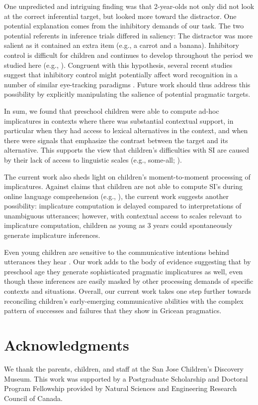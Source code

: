 \documentclass[10pt,letterpaper]{article}
\begin{document}
One unpredicted and intriguing finding was that 2-year-olds not only did not look at the correct inferential target, but looked more toward the distractor. One potential explanation comes from the inhibitory demands of our task. The two potential referents in inference trials differed in saliency: The distractor was more salient as it contained an extra item (e.g., a carrot and a banana). Inhibitory control is difficult for children and continues to develop throughout the period we studied here (e.g.,  ). Congruent with this hypothesis, several recent studies suggest that inhibitory control might potentially affect word recognition in a number of similar eye-tracking paradigms \cite{yurovskybeyond,nordmeyer2013measuring}. Future work should thus address this possibility by explicitly manipulating the salience of potential pragmatic targets.

In sum, we found that preschool children were able to compute ad-hoc implicatures in contexts where there was substantial contextual support, in particular when they had access to lexical alternatives in the context, and when there were signals that emphasize the contrast between the target and its alternative. This supports the view that children's difficulties with SI are caused by their lack of access to linguistic scales (e.g., some-all; ). 

The current work also sheds light on children's moment-to-moment processing of implicatures. Against claims that children are not able to compute SI's during online language comprehension (e.g., ), the current work suggests another possibility: implicature computation is delayed compared to interpretations of unambiguous utterances; however, with contextual access to scales relevant to implicature computation, children as young as 3 years could spontaneously generate implicature inferences. 

Even young children are sensitive to the communicative intentions behind utterances they hear \cite{clark2009first,baldwin1993early}. Our work adds to the body of evidence suggesting that by preschool age they generate sophisticated pragmatic implicatures as well, even though these inferences are easily masked by other processing demands of specific contexts and situations. Overall, our current work takes one step further towards reconciling children's early-emerging communicative abilities with the complex pattern of successes and failures that they show in Gricean pragmatics.

\section{Acknowledgments}

We thank the parents, children, and staff at the San Jose Children's Discovery Museum. This work was supported by a Postgraduate Scholarship and Doctoral Program Fellowship provided by Natural Sciences and Engineering Research Council of Canada.



\setlength{\bibleftmargin}{.125in}
\setlength{\bibindent}{-\bibleftmargin}


\end{document}
